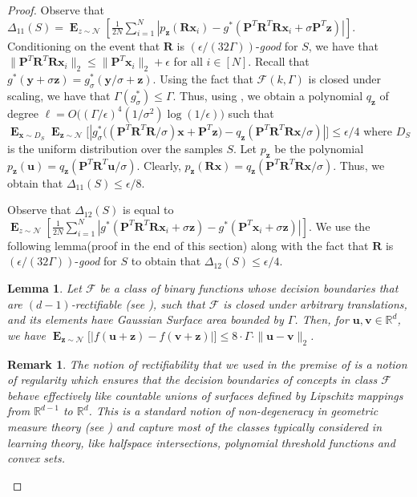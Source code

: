 \documentclass[10pt,a4paper]{article}
\newtheorem{lemma}{Lemma}[section]
\newtheorem{remark}{Remark}[section]
\newcommand\twonorm[1]{\|#1\|_2}
\renewcommand\vec[1]{\mathbf{#1}}
\DeclareMathOperator*{\E}{\mathbf{E}}
\newcommand{\R}{\mathbb{R}}
\newcommand{\1}{\Ind}
\newcommand{\x}{\vec x}
\newcommand{\vv}{\vec v}
\newcommand{\vu}{\vec u}
\newcommand{\z}{\vec z}
\newcommand{\F}{\mathcal{F}}
\newcommand{\Gauss}{\mathcal{N}}
\begin{document}
\begin{proof}
Observe that $\Delta_{11}(S)=\E_{z\sim \Gauss}\left[\frac{1}{2N}\sum_{i=1}^{N}|p_{\z}(\vec R\x_i)-g^*(\vec P^T\vec R^T \vec R\x_i+\sigma\vec P^T\z)|\right]$.
Conditioning on the event that $\vec R$ is $(\epsilon/(32\Gamma))$-\textit{good} for $S$, we have that $\twonorm{\vec P^T \vec R^T\vec R \x_i}\leq \twonorm{\vec P^T \x_i}+\epsilon$ for all $i\in [N]$. Recall that $g^*(\vec y+\sigma \z)=g_{\sigma}^*(\vec y/\sigma+\z)$. Using the fact that $\F(k,\Gamma)$ is closed under scaling, we have that $\Gamma(g^*_{\sigma})\leq \Gamma$. Thus, using , we obtain a polynomial $q_{\z}$ of degree $\ell=O\bigl((\Gamma/\epsilon)^4(1/\sigma^2)\log(1/\epsilon))$ such that $\E_{\x\sim D_S}\E_{\z\sim \Gauss}\bigl[|g_{\sigma}^*\bigl((\vec P^T\vec R^T \vec R/ \sigma) \x+\vec P^T\z\bigr)-q_{\z}(\vec P^T\vec R^T\vec R \x/\sigma)|\bigr]\leq \epsilon/4$ where $D_S$ is the uniform distribution over the samples $S$. Let $p_{\z}$ be the polynomial $p_{\z}(\vu)=q_{\z}(\vec P^T\vec R^T\vu/\sigma)$. Clearly, $p_{\z}(\vec R\x)=q_{\z}(\vec P^T\vec R^T\vec R\x/\sigma)$. Thus, we obtain that $\Delta_{11}(S)\leq \epsilon/8$.

Observe that $\Delta_{12}(S)$ is equal to $\E_{z\sim \Gauss}\left[\frac{1}{2N}\sum_{i=1}^{N}|g^*( \vec P^T \vec R^T \vec R\x_i+\sigma\z)-g^*(\vec P^T\x_i+\sigma \z)|\right]$. We use the following lemma(proof in the end of this section) along with the fact that $\vec R$ is $(\epsilon/(32\Gamma))$-\textit{good} for $S$ to obtain that $\Delta_{12}(S)\leq \epsilon/4$. 
\begin{lemma}
\label{lem:gsa_shift}
    Let $\F$ be a class of binary functions whose decision boundaries that are $(d-1)$-rectifiable (see \cite{federer1969geometric}), such that $\F$ is closed under arbitrary translations, and its elements have Gaussian Surface area bounded by $\Gamma$. Then, for $\vu,\vv\in \R^d$, we have $\E_{\z\sim \Gauss}\bigl[|f(\vu+\z)-f(\vv+\z)|\bigr]\leq 8\cdot\Gamma\cdot\twonorm{\vu-\vv}$.
\end{lemma}

\begin{remark}
    The notion of rectifiability that we used in the premise of  is a notion of regularity which ensures that the decision boundaries of concepts in class $\F$ behave effectively like countable unions of surfaces defined by Lipschitz mappings from $\R^{d-1}$ to $\R^d$. This is a standard notion of non-degeneracy in geometric measure theory (see \cite{federer1969geometric}) and capture most of the classes typically considered in learning theory, like halfspace intersections, polynomial threshold functions and convex sets.
\end{remark}


\end{proof}
\end{document}
